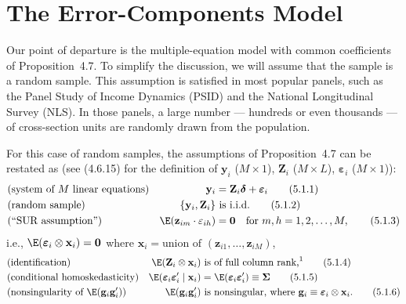 
\section{The Error-Components Model}
\label{sec:5.1}

Our point of departure is the multiple-equation model with common coefficients
of Proposition~4.7. To simplify the discussion, we will assume that the sample is
a random sample. This assumption is satisfied in most popular panels, such as the
Panel Study of Income Dynamics (PSID) and the National Longitudinal Survey
(NLS). In those panels, a large number --- hundreds or even thousands --- of cross-section
units are randomly drawn from the population.

For this case of random samples, the assumptions of Proposition~4.7 can be
restated as (see (4.6.15) for the definition of $\mathbf{y}_i$ ($M \times 1$),
$\mathbf{Z}_i$ ($M \times L$), $\boldsymbol{\varepsilon}_i$ ($M \times 1$)):
\begin{align}
  &\text{(system of $M$ linear equations)}
  &\mathbf{y}_i &= \mathbf{Z}_i \boldsymbol{\delta} + \boldsymbol{\varepsilon}_i
  \label{eq:5.1.1} \tag{5.1.1} \\
  &\text{(random sample)}
  &\{\mathbf{y}_i, \mathbf{Z}_i\} &\text{ is i.i.d.}
  \label{eq:5.1.2} \tag{5.1.2} \\
  &\text{(``SUR assumption'')}
  &\E(\mathbf{z}_{im} \cdot \varepsilon_{ih}) &= \mathbf{0}
  \quad \text{for } m, h = 1, 2, \ldots, M,
  \label{eq:5.1.3} \tag{5.1.3}
\end{align}
i.e., $\E(\boldsymbol{\varepsilon}_i \otimes \mathbf{x}_i) = \mathbf{0}$ where
$\mathbf{x}_i = \text{union of } (\mathbf{z}_{i1}, \ldots, \mathbf{z}_{iM})$,
\begin{align}
  &\text{(identification)}
  &\E(\mathbf{Z}_i \otimes \mathbf{x}_i) &\text{ is of full column rank,}^{1}
  \label{eq:5.1.4} \tag{5.1.4} \\
  &\text{(conditional homoskedasticity)}
  &\E(\boldsymbol{\varepsilon}_i \boldsymbol{\varepsilon}_i' \mid \mathbf{x}_i)
  &= \E(\boldsymbol{\varepsilon}_i \boldsymbol{\varepsilon}_i') \equiv \boldsymbol{\Sigma}
  \label{eq:5.1.5} \tag{5.1.5} \\
  &\text{(nonsingularity of $\E(\mathbf{g}_i\mathbf{g}_i')$)}
  &\E(\mathbf{g}_i\mathbf{g}_i') &\text{ is nonsingular, where }
  \mathbf{g}_i \equiv \boldsymbol{\varepsilon}_i \otimes \mathbf{x}_i.
  \label{eq:5.1.6} \tag{5.1.6}
\end{align}

